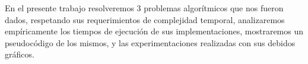 En el presente trabajo resolveremos 3 problemas algorítmicos que nos fueron dados, respetando sus requerimientos de complejidad temporal, analizaremos empíricamente los tiempos de ejecución de sus implementaciones, mostraremos un pseudocódigo de los mismos, y las experimentaciones realizadas con sus debidos gráficos.
